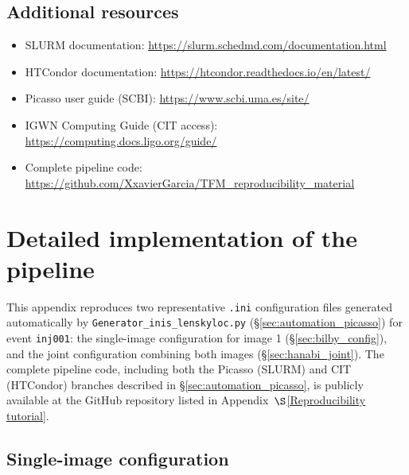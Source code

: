 \section{Additional resources}
\begin{itemize}
  \item SLURM documentation: \url{https://slurm.schedmd.com/documentation.html}
  \item HTCondor documentation: \url{https://htcondor.readthedocs.io/en/latest/}
  \item Picasso user guide (SCBI): \url{https://www.scbi.uma.es/site/}
  \item IGWN Computing Guide (CIT access): \url{https://computing.docs.ligo.org/guide/}
  \item Complete pipeline code: \url{https://github.com/XxavierGarcia/TFM_reproducibility_material}
\end{itemize}



\renewcommand{\thechapter}{C} 
\chapter{Detailed implementation of the pipeline}
\label{implementataion_pipeline}

This appendix reproduces two representative \texttt{.ini} configuration files generated automatically by \texttt{Generator\_inis\_lenskyloc.py} (\S\ref{sec:automation_picasso}) for event \texttt{inj001}: the single-image configuration for image 1 (\S\ref{sec:bilby_config}), and the joint configuration combining both images (\S\ref{sec:hanabi_joint}). The complete pipeline code, including both the Picasso (SLURM) and CIT (HTCondor) branches described in \S\ref{sec:automation_picasso}, is publicly available at the GitHub repository listed in Appendix~$\S$\ref{Reproducibility tutorial}.

\section{Single-image configuration}
\label{app:single_ini_example}

